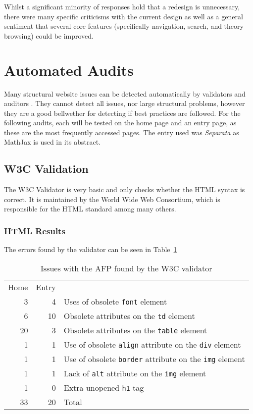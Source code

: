 \documentclass[bsc,frontabs,oneside,singlespacing,parskip,deptreport,logo]{infthesis}
\begin{document}
Whilst a significant minority of responses hold that a redesign is unnecessary, there were many specific criticisms with the current design as well as a general sentiment that several core features (specifically navigation, search, and theory browsing) could be improved. 

\section{Automated Audits} \label{automated_current}

Many structural website issues can be detected automatically by validators and auditors \cite{ivory2013automated}. They cannot detect all issues, nor large structural problems, however they are a good bellwether for detecting if best practices are followed. For the following audits, each will be tested on the home page and an entry page, as these are the most frequently accessed pages. The entry used was \emph{Separata} as MathJax is used in its abstract.

\subsection{W3C Validation}

The W3C Validator \cite{w3c_validator} is very basic and only checks whether the HTML syntax is correct. It is maintained by the World Wide Web Consortium, which is responsible for the HTML standard among many others.

\subsubsection{HTML Results}

The errors found by the validator can be seen in Table~\ref{W3C-current}

\begin{table}[h]
\centering
{}
\begin{tabularx}{0.5\textwidth}{rrl}
Home & Entry &                                                                   \\
3    & 4     & Uses of obsolete \texttt{font} element                               \\
6    & 10    & Obsolete attributes on the \texttt{td} element                      \\
20   & 3     & Obsolete attributes on the \texttt{table} element                   \\
1    & 1     & Use of obsolete \texttt{align} attribute on the \texttt{div} element  \\
1    & 1     & Use of obsolete \texttt{border} attribute on the \texttt{img} element \\
1    & 1     & Lack of \texttt{alt} attribute on the \texttt{img} element            \\
1    & 0     & Extra unopened \texttt{h1} tag                                      \\ \hline
33   & 20    & Total                                                              
\end{tabularx}
\caption{Issues with the AFP found by the W3C validator}
\label{W3C-current}
\end{table}
\end{document}
